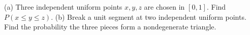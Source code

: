 (a) Three independent uniform points $ x,y,z $ are chosen in $[0,1]$. Find $ P(x\le y\le z)$. (b) Break a unit segment at two independent uniform points. Find the probability the three pieces form a nondegenerate triangle.
